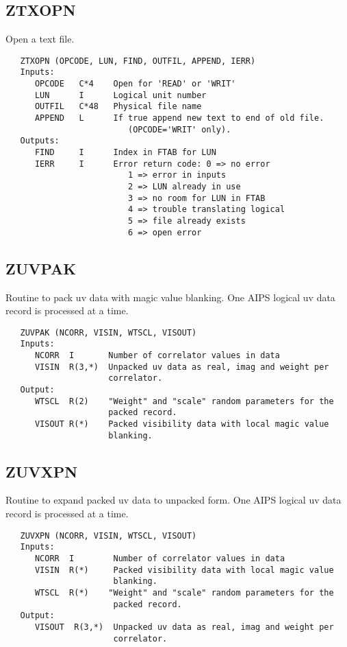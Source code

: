 \subsection{ZTXOPN}
Open a text file.
\begin{verbatim}
   ZTXOPN (OPCODE, LUN, FIND, OUTFIL, APPEND, IERR)
   Inputs:
      OPCODE   C*4    Open for 'READ' or 'WRIT'
      LUN      I      Logical unit number
      OUTFIL   C*48   Physical file name
      APPEND   L      If true append new text to end of old file.
                         (OPCODE='WRIT' only).
   Outputs:
      FIND     I      Index in FTAB for LUN
      IERR     I      Error return code: 0 => no error
                         1 => error in inputs
                         2 => LUN already in use
                         3 => no room for LUN in FTAB
                         4 => trouble translating logical
                         5 => file already exists
                         6 => open error
\end{verbatim}

\subsection{ZUVPAK}
Routine to pack uv data with magic value blanking.  One AIPS
logical uv data record is processed at a time.
\begin{verbatim}
   ZUVPAK (NCORR, VISIN, WTSCL, VISOUT)
   Inputs:
      NCORR  I       Number of correlator values in data
      VISIN  R(3,*)  Unpacked uv data as real, imag and weight per
                     correlator.
   Output:
      WTSCL  R(2)    "Weight" and "scale" random parameters for the
                     packed record.
      VISOUT R(*)    Packed visibility data with local magic value
                     blanking.
\end{verbatim}

\subsection{ZUVXPN}
Routine to expand packed uv data to unpacked form.  One AIPS
logical uv data record is processed at a time.
\begin{verbatim}
   ZUVXPN (NCORR, VISIN, WTSCL, VISOUT)
   Inputs:
      NCORR  I        Number of correlator values in data
      VISIN  R(*)     Packed visibility data with local magic value
                      blanking.
      WTSCL  R(*)    "Weight" and "scale" random parameters for the
                      packed record.
   Output:
      VISOUT  R(3,*)  Unpacked uv data as real, imag and weight per
                      correlator.
\end{verbatim}


